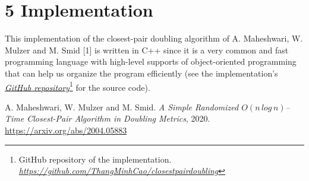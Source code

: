 \documentclass[12pt,english,]{article}
\begin{document}
\hypertarget{implementation}{%
\section{\texorpdfstring{5
\enspace Implementation}{5 Implementation}}\label{implementation}}

This implementation of the closest-pair doubling algorithm of A.
Maheshwari, W. Mulzer and M. Smid {[}1{]} is written in C++ since it is
a very common and fast programming language with high-level supports of
object-oriented programming that can help us organize the program
efficiently (see the implementation's
\href{https://github.com/ThangMinhCao/closestpairdoubling}{\emph{GitHub
repository}}\footnote{GitHub repository of the implementation.
  \href{https://github.com/ThangMinhCao/closestpairdoubling}{\emph{https://github.com/ThangMinhCao/closestpairdoubling}}}
for the source code).

\medskip

\begin{thebibliography}{9}
A. Maheshwari, W. Mulzer and M. Smid. \emph{A Simple Randomized $O(n\,log\,n)$–Time Closest-Pair Algorithm in Doubling Metrics}, 2020. \url{https://arxiv.org/abs/2004.05883}
\end{thebibliography}
\end{document}
